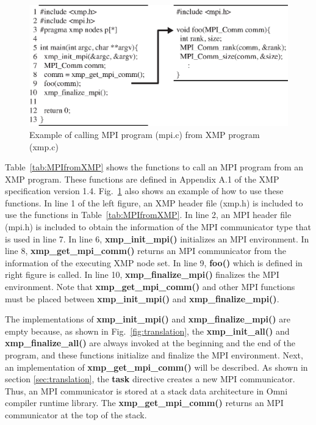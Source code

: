 \documentclass[graybox]{svmult}
\begin{document}
\begin{figure}[h]
\sidecaption
\includegraphics[scale=.82]{img/program1.eps}
\caption{Example of calling MPI program (mpi.c) from XMP program (xmp.c)\cite{pgas-ei}} \label{fig:program1}
\end{figure}

Table~\ref{tab:MPIfromXMP}  shows  the functions to call an MPI program from an XMP program.
These functions are defined in Appendix A.1 of the XMP specification version 1.4\cite{xmp-spec}.
Fig.~\ref{fig:program1} also shows an example of how to use these functions.
In line 1 of the left figure, an XMP header file (xmp.h) is included to use the functions in Table~\ref{tab:MPIfromXMP}.
In line 2, an MPI header file (mpi.h) is included to obtain the information of the MPI communicator type that is used in line 7.
In line 6,  {\bf xmp\_init\_mpi()} initializes an MPI environment.
In line 8,  {\bf xmp\_get\_mpi\_comm()}  returns an MPI communicator from the information of the executing XMP node set.
In line 9,  {\bf foo()}  which is defined in right figure is called.
In line 10,  {\bf xmp\_finalize\_mpi()}  finalizes the MPI environment.
Note that  {\bf xmp\_get\_mpi\_comm()}  and other MPI functions must be placed between  {\bf xmp\_init\_mpi()} and {\bf xmp\_finalize\_mpi()}.

The implementations of  {\bf xmp\_init\_mpi()} and {\bf xmp\_finalize\_mpi()} are empty because,
as shown in Fig.~\ref{fig:translation},
the {\bf xmp\_init\_all()} and {\bf xmp\_finalize\_all()} are always invoked at the beginning and the end of the program, and these functions initialize and finalize the MPI environment.
Next, an implementation of {\bf xmp\_get\_mpi\_comm()} will be described. 
As shown in section \ref{sec:translation}, the \textbf{task} directive creates a new MPI communicator.
Thus, an MPI communicator is stored at a stack data architecture in Omni compiler runtime library. 
The {\bf xmp\_get\_mpi\_comm()} returns an MPI communicator at the top of the stack.
\end{document}
